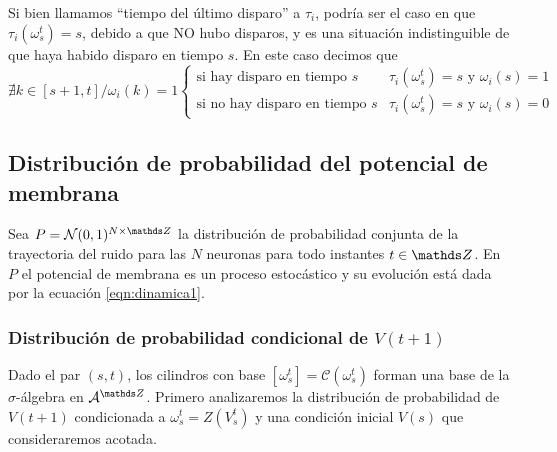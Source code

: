 Si bien llamamos ``tiempo del último disparo'' a $\tau_i$, podría ser el caso en que $\tau_i(\omega_s^t)=s$, debido a que NO hubo disparos, y es una situación indistinguible de que haya habido disparo en tiempo $s$.
En este caso decimos que
\begin{equation*}
    \nexists  k \in [s+1,t] / \omega_i(k)=1 \left\{ \begin{array}{ll}
        \text{si hay disparo en tiempo }s   & \tau_i(\omega_s^t)=s \text{ y }  \omega_i(s) = 1 \\ 
        \text{si no hay disparo en tiempo }s   & \tau_i(\omega_s^t)=s \text{ y }  \omega_i(s) = 0
    \end{array}\right.
\end{equation*}

\subsection{Distribución de probabilidad del potencial de membrana}

Sea $P = \mathcal{N}(0,1)^{N \times \enteros}$ la distribución de probabilidad conjunta de la trayectoria del ruido para las $N$ neuronas para todo instantes $t\in \enteros$. En $P$ el potencial de membrana es un proceso estocástico y su evolución está dada por la ecuación \eqref{eqn:dinamica1}.

\subsubsection{Distribución de probabilidad condicional de $V(t+1)$}

Dado el par $(s,t)$, los cilindros con base $[\omega_s^t]=\mathcal{C}(\omega_s^t)$ forman una base de la $\sigma$-álgebra en $\mathcal{A}^{\enteros}$.
Primero analizaremos la distribución de probabilidad de $V(t+1)$ condicionada a $\omega_s^t=Z(V_s^t)$ y una condición inicial $V(s)$ que consideraremos acotada.

